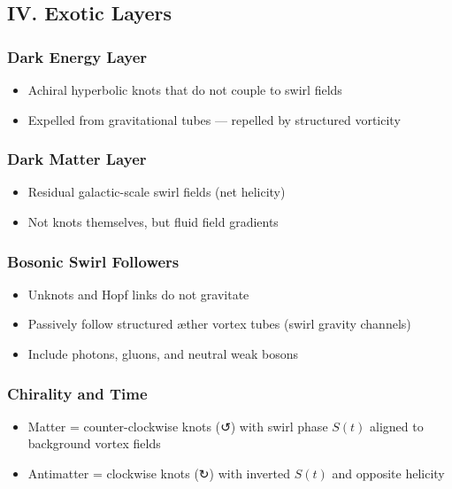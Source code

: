 \subsection*{IV. Exotic Layers}

\subsubsection*{Dark Energy Layer}
\begin{itemize}
    \item Achiral hyperbolic knots that do not couple to swirl fields
    \item Expelled from gravitational tubes — repelled by structured vorticity
\end{itemize}

\subsubsection*{Dark Matter Layer}
\begin{itemize}
    \item Residual galactic-scale swirl fields (net helicity)
    \item Not knots themselves, but fluid field gradients
\end{itemize}

\subsubsection*{Bosonic Swirl Followers}
\begin{itemize}
    \item Unknots and Hopf links do not gravitate
    \item Passively follow structured æther vortex tubes (swirl gravity channels)
    \item Include photons, gluons, and neutral weak bosons
\end{itemize}

\subsubsection*{Chirality and Time}

\begin{itemize}
    \item Matter = counter-clockwise knots (↺) with swirl phase $S(t)$ aligned to background vortex fields
    \item Antimatter = clockwise knots (↻) with inverted $S(t)$ and opposite helicity
\end{itemize}

